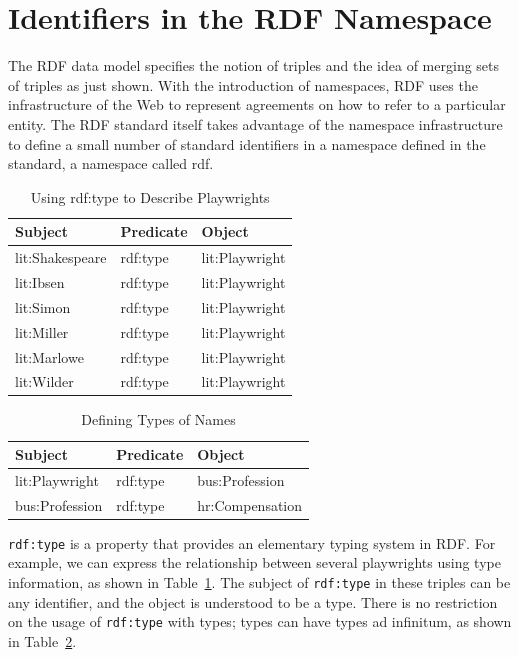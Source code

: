 \section{Identifiers in the RDF Namespace}

The RDF data model specifies the notion of triples and the idea of
merging sets of triples as just shown. With the introduction of
namespaces, RDF uses the infrastructure of the Web to represent
agreements on how to refer to a particular entity. The RDF standard itself takes
advantage of the namespace infrastructure to define a small number of
standard identifiers in a namespace defined in the standard, a namespace
called rdf.


\begin{table}[h]
\centering
\begin{tabular}{||l l l ||} 
 \hline
 Subject&Predicate&Object \\ [0.5ex] 
 \hline\hline
lit:Shakespeare&rdf:type&lit:Playwright \\
lit:Ibsen&rdf:type&lit:Playwright \\
lit:Simon&rdf:type&lit:Playwright \\
lit:Miller&rdf:type&lit:Playwright \\
lit:Marlowe&rdf:type&lit:Playwright \\
lit:Wilder&rdf:type&lit:Playwright \\
\hline
\end{tabular}
\caption{Using rdf:type to Describe Playwrights}
\label{tab:ch3.9}
\end{table}


\begin{table}[h]
\centering
\begin{tabular}{||l l l ||} 
 \hline
 Subject&Predicate&Object \\ [0.5ex] 
 \hline\hline
lit:Playwright&rdf:type&bus:Profession \\
bus:Profession&rdf:type&hr:Compensation \\
\hline
\end{tabular}
\caption{Defining Types of Names}
\label{tab:ch3.10}
\end{table}



\texttt{rdf:type} is a property that provides an elementary typing system in RDF.
For example, we can express the relationship between several playwrights
using type information, as shown in Table~\ref{tab:ch3.9}. The subject of \texttt{rdf:type}
in these triples can be any identifier, and the object is understood to
be a type. There is no restriction on the usage of \texttt{rdf:type}
with types;
types can have types ad infinitum, as shown in Table~\ref{tab:ch3.10}.

